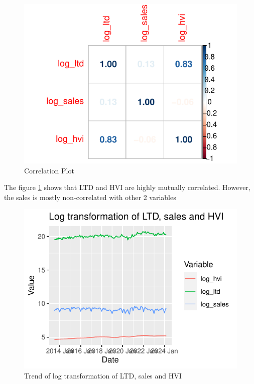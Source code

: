 \documentclass[11pt,a4paper,]{article}
\begin{document}
\begin{figure}[H]

{\centering \includegraphics{Final_Report_files/figure-latex/corrplot-1} 

}

\caption{Correlation Plot}\label{fig:corrplot}
\end{figure}

The figure \ref{fig:corrplot} shows that LTD and HVI are highly mutually correlated. However, the sales is mostly non-correlated with other 2 variables

\begin{figure}[H]

{\centering \includegraphics{Final_Report_files/figure-latex/longtermlog-1} 

}

\caption{Trend of log transformation of LTD, sales and HVI}\label{fig:longtermlog}
\end{figure}
\end{document}
